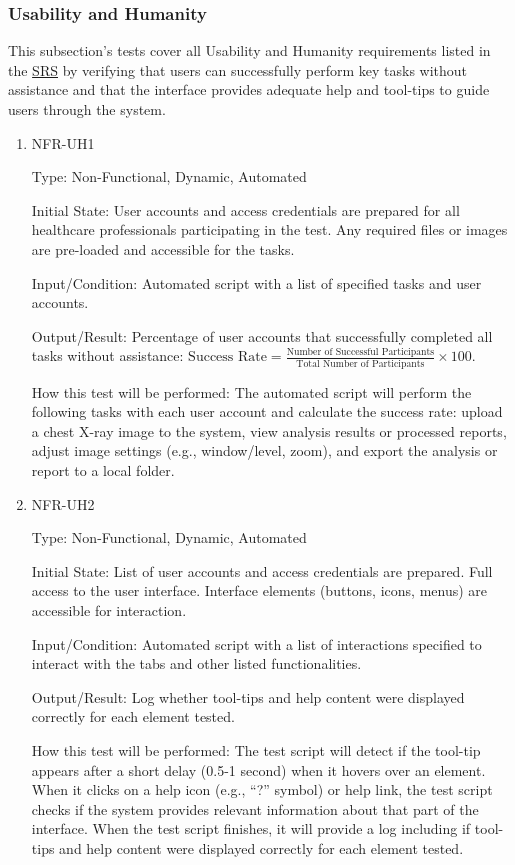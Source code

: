 \documentclass[12pt, titlepage]{article}
\begin{document}
\subsubsection{Usability and Humanity}

This subsection's tests cover all Usability and Humanity requirements listed in the \href{https://github.com/RezaJodeiri/CXR-Capstone/blob/main/docs/SRS/SRS.pdf}{SRS} \citep{SRS}
 by verifying that users can successfully perform key tasks without assistance and that the interface provides adequate help and tool-tips to guide users through the system.

\begin{enumerate}

\item{NFR-UH1\\}\label{NFR-UH1}

Type: Non-Functional, Dynamic, Automated

Initial State: User accounts and access credentials are prepared for all healthcare professionals participating in the test. Any required files or images are pre-loaded and accessible for the tasks.

Input/Condition: Automated script with a list of specified tasks and user accounts.

Output/Result: Percentage of user accounts that successfully completed all tasks without assistance: $\text{Success Rate} = \frac{\text{Number of Successful Participants}}{\text{Total Number of Participants}} \times 100$.

How this test will be performed: The automated script will perform the following tasks with each user account and calculate the success rate: upload a chest X-ray image to the system, view analysis results or processed reports, adjust image settings (e.g., window/level, zoom), and export the analysis or report to a local folder.

\item{NFR-UH2\\}\label{NFR-UH2}

Type: Non-Functional, Dynamic, Automated

Initial State: List of user accounts and access credentials are prepared. Full access to the user interface. Interface elements (buttons, icons, menus) are accessible for interaction.

Input/Condition: Automated script with a list of interactions specified to interact with the tabs and other listed functionalities.

Output/Result: Log whether tool-tips and help content were displayed correctly for each element tested.

How this test will be performed: The test script will detect if the tool-tip appears after a short delay (0.5-1 second) when it hovers over an element. When it clicks on a help icon (e.g., “?” symbol) or help link, the test script checks if the system provides relevant information about that part of the interface. When the test script finishes, it will provide a log including if tool-tips and help content were displayed correctly for each element tested.

\end{enumerate}
\end{document}
